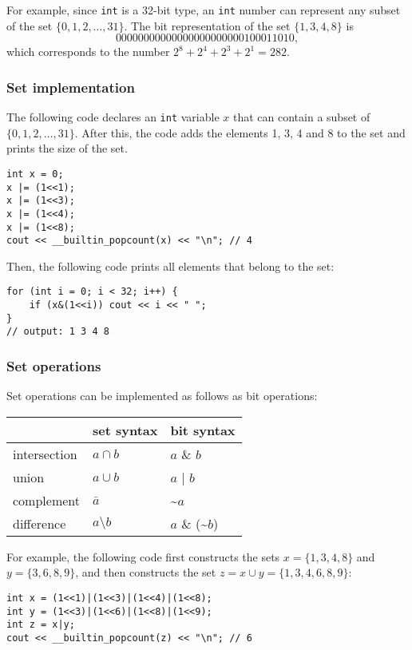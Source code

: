 For example, since \texttt{int} is a 32-bit type,
an \texttt{int} number can represent any subset
of the set $\{0,1,2,\ldots,31\}$.
The bit representation of the set $\{1,3,4,8\}$ is
\[00000000000000000000000100011010,\]
which corresponds to the number $2^8+2^4+2^3+2^1=282$.

\subsubsection{Set implementation}

The following code declares an \texttt{int}
variable $x$ that can contain
a subset of $\{0,1,2,\ldots,31\}$.
After this, the code adds the elements 1, 3, 4 and 8
to the set and prints the size of the set.
\begin{lstlisting}
int x = 0;
x |= (1<<1);
x |= (1<<3);
x |= (1<<4);
x |= (1<<8);
cout << __builtin_popcount(x) << "\n"; // 4
\end{lstlisting}
Then, the following code prints all
elements that belong to the set:
\begin{lstlisting}
for (int i = 0; i < 32; i++) {
    if (x&(1<<i)) cout << i << " ";
}
// output: 1 3 4 8
\end{lstlisting}

\subsubsection{Set operations}

Set operations can be implemented as follows as bit operations:

\begin{center}
\begin{tabular}{lll}
& set syntax & bit syntax \\
\hline
intersection & $a \cap b$ & $a$ \& $b$ \\
union & $a \cup b$ & $a$ | $b$ \\
complement & $\bar a$ & \textasciitilde$a$ \\
difference & $a \setminus b$ & $a$ \& (\textasciitilde$b$) \\
\end{tabular}
\end{center}

For example, the following code first constructs
the sets $x=\{1,3,4,8\}$ and $y=\{3,6,8,9\}$,
and then constructs the set $z = x \cup y = \{1,3,4,6,8,9\}$:

\begin{lstlisting}
int x = (1<<1)|(1<<3)|(1<<4)|(1<<8);
int y = (1<<3)|(1<<6)|(1<<8)|(1<<9);
int z = x|y;
cout << __builtin_popcount(z) << "\n"; // 6
\end{lstlisting}

